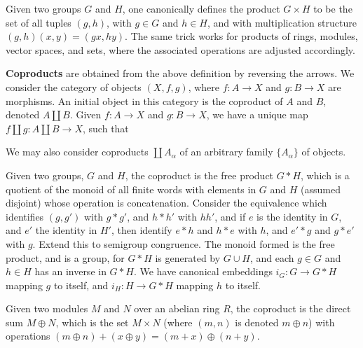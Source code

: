 \begin{example}
    Given two groups $G$ and $H$, one canonically defines the product $G \times H$ to be the set of all tuples $(g,h)$, with $g \in G$ and $h \in H$, and with multiplication structure $(g,h)(x,y) = (gx,hy)$. The same trick works for products of rings, modules, vector spaces, and sets, where the associated operations are adjusted accordingly.
\end{example}

{\bf Coproducts} are obtained from the above definition by reversing the arrows. We consider the category of objects $(X,f,g)$, where $f: A \to X$ and $g: B \to X$ are morphisms. An initial object in this category is the coproduct of $A$ and $B$, denoted $A \coprod B$. Given $f: A \to X$ and $g: B \to X$, we have a unique map $f \coprod g: A \coprod B \to X$, such that
%
\begin{center}
\end{center}
%
We may also consider coproducts $\coprod A_\alpha$ of an arbitrary family $\{ A_\alpha \}$ of objects.

\begin{example}
    Given two groups, $G$ and $H$, the coproduct is the free product $G * H$, which is a quotient of the monoid of all finite words with elements in $G$ and $H$ (assumed disjoint) whose operation is concatenation. Consider the equivalence which identifies $(g,g')$ with $g * g'$, and $h * h'$ with $hh'$, and if $e$ is the identity in $G$, and $e'$ the identity in $H'$, then identify $e * h$ and $h * e$ with $h$, and $e' * g$ and $g * e'$ with $g$. Extend this to semigroup congruence. The monoid formed is the free product, and is a group, for $G * H$ is generated by $G \cup H$, and each $g \in G$ and $h \in H$ has an inverse in $G * H$. We have canonical embeddings $i_G: G \to G * H$ mapping $g$ to itself, and $i_H: H \to G * H$ mapping $h$ to itself.
\end{example}

\begin{example}
    Given two modules $M$ and $N$ over an abelian ring $R$, the coproduct is the direct sum $M \oplus N$, which is the set $M \times N$ (where $(m,n)$ is denoted $m \oplus n$) with operations $(m \oplus n) + (x \oplus y) = (m + x) \oplus (n + y)$.
\end{example}

